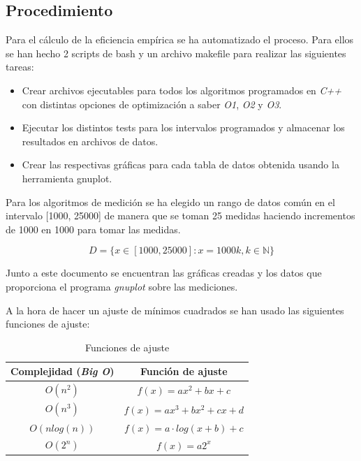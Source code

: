 \documentclass{article}
\begin{document}
\subsection{Procedimiento}

Para el cálculo de la eficiencia empírica se ha automatizado el
proceso. Para ellos se han hecho 2 scripts de bash y un archivo
makefile para realizar las siguientes tareas:

\begin{itemize}
\item Crear archivos ejecutables para todos los algoritmos programados
  en \textit{C++} con distintas opciones de optimización a saber
  \textit{O1}, \textit{O2} y \textit{O3}.
\item Ejecutar los distintos tests para los intervalos programados y
  almacenar los resultados en archivos de datos.
\item Crear las respectivas gráficas para cada tabla de datos obtenida usando la herramienta gnuplot.
\end{itemize}

Para los algoritmos de medición se ha elegido un rango de datos común
en el intervalo [1000, 25000] de manera que se toman 25 medidas
haciendo incrementos de 1000 en 1000 para tomar las medidas.

$$D = \{x \in [1000, 25000]: x = 1000k, k \in \mathbb{N}\}$$

Junto a este documento se encuentran las gráficas creadas y los datos
que proporciona el programa \textit{gnuplot} sobre las mediciones.

A la hora de hacer un ajuste de mínimos cuadrados se han usado las
siguientes funciones de ajuste:

\begin{table}[H]
  \centering
  \begin{tabular}{|c|c|}
    \hline
    Complejidad (\textit{Big O}) & Función de ajuste \\ \hline
    $O(n^2)$ & $f(x) = ax^2 + bx + c$ \\ \hline
    $O(n^3)$ & $f(x) = ax^3 + bx^2 + cx + d$ \\ \hline
    $O(nlog(n))$ & $f(x) = a\cdot log(x+b) + c$ \\ \hline
    $O(2^n)$ & $f(x) = a2^x$ \\ \hline


  \end{tabular}
  \caption{Funciones de ajuste}
\end{table}
\end{document}
